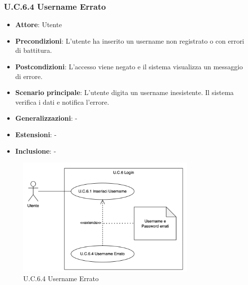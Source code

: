 \subsubsection{U.C.6.4 Username Errato}
\begin{itemize}
    \item \textbf{Attore}: Utente
    \item \textbf{Precondizioni}: L'utente ha inserito un username non registrato o con errori di battitura.
    \item \textbf{Postcondizioni}: L'accesso viene negato e il sistema visualizza un messaggio di errore.
    \item \textbf{Scenario principale}: L'utente digita un username inesistente. Il sistema verifica i dati e notifica l'errore.
    \item \textbf{Generalizzazioni}: -
    \item \textbf{Estensioni}: -
    \item \textbf{Inclusione}: -
\end{itemize}
\begin{figure}[H]
    \centering
    \includegraphics[width=0.8\textwidth]{img/UC6.4.png}
    \caption{U.C.6.4 Username Errato}
\end{figure}
\newpage

